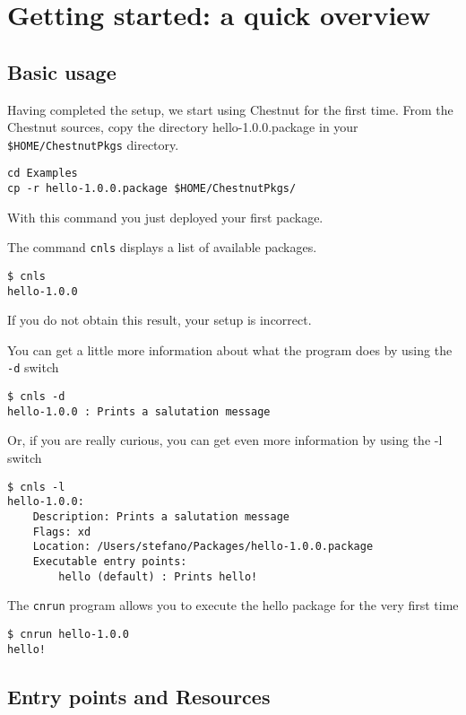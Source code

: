 \section{Getting started: a quick overview}

\subsection{Basic usage}

Having completed the setup, we start using Chestnut for the first time. From the Chestnut sources,
copy the directory hello-1.0.0.package in your \verb+$HOME/ChestnutPkgs+ directory.

\begin{verbatim}
cd Examples
cp -r hello-1.0.0.package $HOME/ChestnutPkgs/ 
\end{verbatim}

With this command you just deployed your first package. 

The command \verb+cnls+ displays a list of available packages.

\begin{verbatim}
$ cnls
hello-1.0.0
\end{verbatim}

If you do not obtain this result, your setup is incorrect.

You can get a little more information about what the program does by using the
\verb+-d+ switch

\begin{verbatim}
$ cnls -d
hello-1.0.0 : Prints a salutation message
\end{verbatim}

Or, if you are really curious, you can get even more information by using the -l switch

\begin{verbatim}
$ cnls -l
hello-1.0.0:
    Description: Prints a salutation message
    Flags: xd
    Location: /Users/stefano/Packages/hello-1.0.0.package
    Executable entry points:
        hello (default) : Prints hello!
\end{verbatim}

The \verb+cnrun+ program allows you to execute the hello package for the very first time

\begin{verbatim}
$ cnrun hello-1.0.0
hello!
\end{verbatim}

\subsection{Entry points and Resources}

